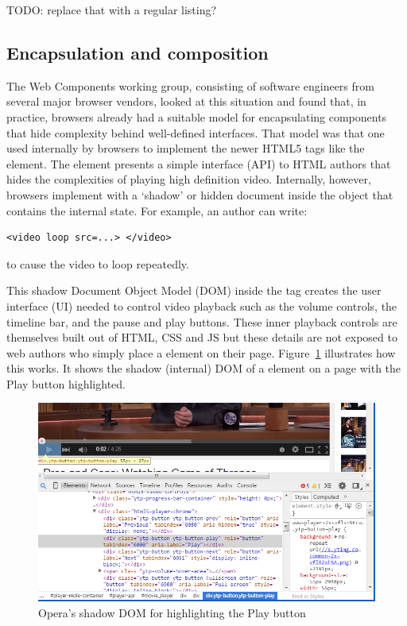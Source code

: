 TODO: replace that with a regular listing?

\subsection{Encapsulation and composition}

The Web Components working group, consisting of software engineers from several major browser vendors, looked at this situation and found that, in practice, browsers already had a suitable model for encapsulating components that hide complexity behind well-defined interfaces.
That model was that one used internally by browsers to implement the newer HTML5 tags like the \textbf{} element. 
The  element presents a simple interface (API) to HTML authors that hides the complexities of playing high definition video.
Internally, however, browsers implement  with a `shadow' or hidden document inside the object that contains the internal state. 
For example, an author can write:
\begin{lstlisting}[language=HTML5,numbers=none]
	<video loop src=...> </video>
\end{lstlisting}
to cause the video to loop repeatedly.

This shadow Document Object Model (DOM) inside the  tag creates the user interface (UI) needed to control video playback such as the volume controls, the timeline bar, and the pause and play buttons.
These inner playback controls are themselves built out of HTML, CSS and JS but these details are not exposed to web authors who simply place a  element on their page. 
Figure~\ref{f:html5video} illustrates how this works. It shows the shadow (internal) DOM of a  element on a page with the Play button  highlighted.

% 
\begin{figure}[htb]
\centering
 \includegraphics[width=5.5in]{images/html5_video_control.png}
\caption{Opera's shadow DOM for  highlighting the Play button}
\label{f:html5video}
\end{figure}
%

